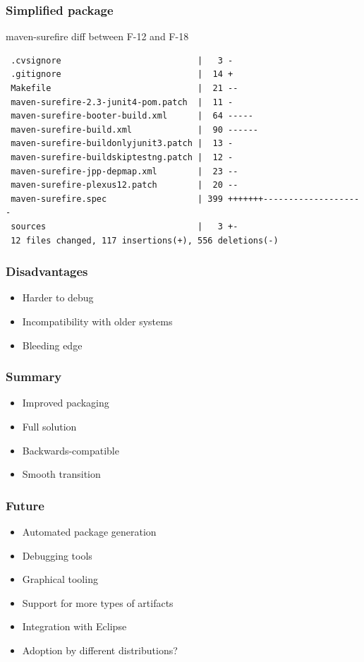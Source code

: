 \documentclass[pdftex,unicode,xcolor=table]{beamer}
\begin{document}
\begin{frame}[fragile]
  \frametitle{Simplified package}
  \begin{block}{maven-surefire diff between F-12 and F-18}
    \scriptsize
\begin{verbatim}
 .cvsignore                           |   3 -
 .gitignore                           |  14 +
 Makefile                             |  21 --
 maven-surefire-2.3-junit4-pom.patch  |  11 -
 maven-surefire-booter-build.xml      |  64 -----
 maven-surefire-build.xml             |  90 ------
 maven-surefire-buildonlyjunit3.patch |  13 -
 maven-surefire-buildskiptestng.patch |  12 -
 maven-surefire-jpp-depmap.xml        |  23 --
 maven-surefire-plexus12.patch        |  20 --
 maven-surefire.spec                  | 399 +++++++--------------------
 sources                              |   3 +-
 12 files changed, 117 insertions(+), 556 deletions(-)
\end{verbatim}
  \end{block}
\end{frame}

\begin{frame}
  \frametitle{Disadvantages}
  \begin{itemize}
    \item Harder to debug
    \item Incompatibility with older systems
    \item Bleeding edge
  \end{itemize}
\end{frame}

\begin{frame}
  \frametitle{Summary}
  \begin{itemize}
    \item Improved packaging
    \item Full solution
    \item Backwards-compatible
    \item Smooth transition
  \end{itemize}
\end{frame}


\begin{frame}
  \frametitle{Future}
  \begin{itemize}
    \item Automated package generation
    \item Debugging tools
    \item Graphical tooling
    \item Support for more types of artifacts
    \item Integration with Eclipse
    \item Adoption by different distributions?
  \end{itemize}
\end{frame}
\end{document}
